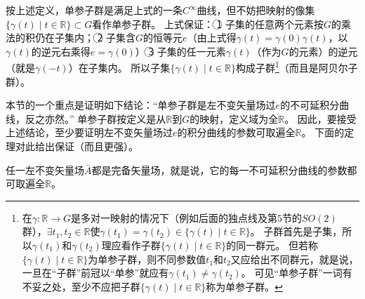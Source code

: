 \begin{note}
    按上述定义，单参子群是满足上式的一条$C^\infty$曲线，但不妨把映射的像集$\{\gamma(t) \mid t \in \mathbb{R}\} \subset G$看作单参子群。
    上式保证：
    \textcircled{1} 子集的任意两个元素按$G$的乘法的积仍在子集内；
    \textcircled{2} 子集含$G$的恒等元$e$（由上式得$\gamma(t) = \gamma(0)\gamma(t)$，以$\gamma(t)$的逆元右乘得$e = \gamma(0)$）
    \textcircled{3} 子集的任一元素$\gamma(t)$（作为$G$的元素）的逆元（就是$\gamma(-t)$）在子集内。
    所以子集$\{\gamma(t) \mid t \in \mathbb{R}\}$构成子群\footnote{
        在$\gamma \colon \mathbb{R} \to G$是多对一映射的情况下（例如后面的独点线及第$5$节的$SO(2)$群），$\exists t_1, t_2 \in \mathbb{R}$使$\gamma(t_1) = \gamma(t_2) \in \{\gamma(t) \mid t \in \mathbb{R}\}$。
        子群首先是子集，所以$\gamma(t_1)$和$\gamma(t_2)$理应看作子群$\{\gamma(t) \mid t \in \mathbb{R}\}$的同一群元。
        但若称$\{\gamma(t) \mid t \in \mathbb{R}\}$为单参子群，则不同参数值$t_1$和$t_2$又应给出不同群元，就是说，一旦在``子群''前冠以``单参''就应有$\gamma(t_1) \neq \gamma(t_2)$。
        可见``单参子群''一词有不妥之处，至少不应把子群$\{\gamma(t) \mid t \in \mathbb{R}\}$称为单参子群。
    }（而且是阿贝尔子群）。
\end{note}

本节的一个重点是证明如下结论：``单参子群是左不变矢量场过$e$的不可延积分曲线，反之亦然。''
单参子群按定义是从$\mathbb{R}$到$G$的映射，定义域为全$\mathbb{R}$。
因此，要接受上述结论，至少要证明左不变矢量场过$e$的积分曲线的参数可取遍全$\mathbb{R}$。
下面的定理对此给出保证（而且更强）。

\begin{theorem}
    任一左不变矢量场$\bar A$都是完备矢量场，就是说，它的每一不可延积分曲线的参数都可取遍全$\mathbb{R}$。
\end{theorem}

